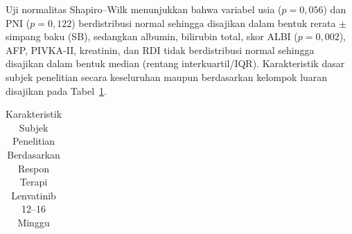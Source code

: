 \documentclass[
  indonesian,
]{report}
\begin{document}
Uji normalitas Shapiro--Wilk menunjukkan bahwa variabel usia
(\(p = 0,056\)) dan PNI (\(p = 0,122\)) berdistribusi normal sehingga
disajikan dalam bentuk rerata \(\pm\) simpang baku (SB), sedangkan
albumin, bilirubin total, skor ALBI (\(p = 0,002\)), AFP, PIVKA-II,
kreatinin, dan RDI tidak berdistribusi normal sehingga disajikan dalam
bentuk median (rentang interkuartil/IQR). Karakteristik dasar subjek
penelitian secara keseluruhan maupun berdasarkan kelompok luaran
disajikan pada Tabel~\ref{tbl-karakteristik}.

{

\begin{longtable}[]{@{}
  >{\raggedright\arraybackslash}p{}
  >{\raggedright\arraybackslash}p{}
  >{\raggedright\arraybackslash}p{}
  >{\raggedright\arraybackslash}p{}
  >{\raggedright\arraybackslash}p{}@{}}

\caption{\label{tbl-karakteristik}Karakteristik Subjek Penelitian
Berdasarkan Respon Terapi Lenvatinib 12--16 Minggu}

\tabularnewline


\end{longtable}}
\end{document}
